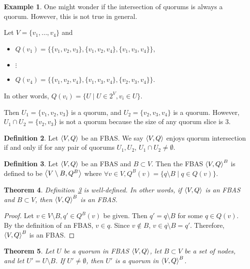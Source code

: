 \documentclass[12pt, psamsfonts]{amsart}
\newtheorem{thm}{Theorem}[section]
\theoremstyle{definition}
\newtheorem{defn}[thm]{Definition}
\newtheorem{exmp}[thm]{Example}
\theoremstyle{remark}
\numberwithin{equation}{section}
\begin{document}
\begin{exmp}
    One might wonder if the intersection of quorums is always a quorum.
    However, this is not true in general.

    Let $V = \{ v_1, \ldots, v_4 \}$ and
    \begin{itemize}
        \item
            $Q(v_1) = \{ \{ v_1, v_2, v_3 \}, \{ v_1, v_2, v_4 \}, \{ v_1, v_3, v_4 \} \}$,
        \item
            $\vdots$
        \item
            $Q(v_4) = \{ \{ v_1, v_2, v_4 \}, \{ v_1, v_3, v_4 \}, \{ v_2, v_3, v_4 \} \}$.
    \end{itemize}

    In other words, $Q(v_i) = \{ U \mid U \in 2^V, v_i \in U \}$.

    Then $U_1 = \{ v_1, v_2, v_3 \}$ is a quorum, and $U_2 = \{ v_2, v_3, v_4 \}$ is a quorum.
    However, $U_1 \cap U_2 = \{ v_2, v_3 \}$ is not a quorum because the size of any quorum slice is 3.
\end{exmp}

\begin{defn}
    Let $\ev{V, Q}$ be an FBAS\@.
    We say $\ev{V, Q}$ enjoys quorum intersection if and only if for any pair of quorums $U_1, U_2$, $U_1 \cap U_2 \ne \emptyset$.
\end{defn}

\begin{defn}\label{delete_fbas}
    Let $\ev{V, Q}$ be an FBAS and $B \subset V$.
    Then the FBAS $\ev{V, Q}^B$ is defined to be $\ev{V \setminus B, Q^B}$ where $\forall v \in V, Q^B(v) = \{ q \setminus B \mid q \in Q(v) \}$.
\end{defn}

\begin{thm}
    Definition~\ref{delete_fbas} is well-defined.
    In other words, if $\ev{V, Q}$ is an FBAS and $B \subset V$, then $\ev{V, Q}^B$ is an FBAS\@.
\end{thm}

\begin{proof}
    Let $v \in V \setminus B, q' \in Q^B(v)$ be given.
    Then $q' = q \setminus B$ for some $q \in Q(v)$.
    By the definition of an FBAS, $v \in q$.
    Since $v \notin B$, $v \in q \setminus B = q'$.
    Therefore, $\ev{V, Q}^B$ is an FBAS\@.
\end{proof}

\begin{thm}\label{quorum_intersection_projected_system}
    Let $U$ be a quorum in FBAS $\ev{V, Q}$, let $B \subset V$ be a set of nodes, and let $U' = U \setminus B$.
    If $U' \ne \emptyset$, then $U'$ is a quorum in $\ev{V, Q}^B$.
\end{thm}
\end{document}
